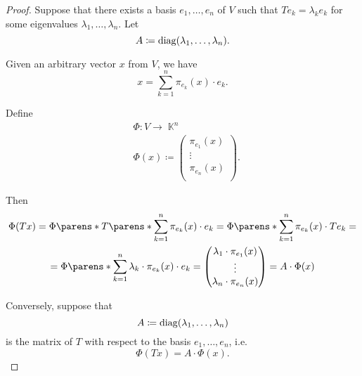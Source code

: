 \begin{proof}
   Suppose that there exists a basis \( e_1, \ldots, e_n \) of \( V \) such that \( T e_k = \lambda_k e_k \) for some eigenvalues \( \lambda_1, \ldots, \lambda_n \). Let
  \begin{equation*}
    A \coloneqq \op{diag}(\lambda_1, \ldots, \lambda_n).
  \end{equation*}

  Given an arbitrary vector \( x \) from \( V \), we have
  \begin{equation*}
    x = \sum_{k=1}^n \pi_{e_k}(x) \cdot e_k.
  \end{equation*}

  Define
  \begin{equation*}
    \begin{aligned}
      &\Phi: V \to \BbbK^n \\
      &\Phi(x) \coloneqq \begin{pmatrix}
        \pi_{e_1}(x) \\
        \vdots \\
        \pi_{e_n}(x) \\
      \end{pmatrix}.
    \end{aligned}
  \end{equation*}

  Then
  \begin{multline*}
    \Phi(T x)
    =
    \Phi\parens*{ T \parens*{ \sum_{k=1}^n \pi_{e_k}(x) \cdot e_k } }
    =
    \Phi\parens*{ \sum_{k=1}^n \pi_{e_k}(x) \cdot T e_k }
    = \\ =
    \Phi\parens*{ \sum_{k=1}^n \lambda_k \cdot \pi_{e_k}(x) \cdot e_k }
    =
    \begin{pmatrix}
      \lambda_1 \cdot \pi_{e_1}(x) \\
      \vdots \\
      \lambda_n \cdot \pi_{e_n}(x)
    \end{pmatrix}
    =
    A \cdot \Phi(x)
  \end{multline*}

   Conversely, suppose that
  \begin{equation*}
    A \coloneqq \op{diag}(\lambda_1, \ldots, \lambda_n)
  \end{equation*}
  is the matrix of \( T \) with respect to the basis \( e_1, \ldots, e_n \), i.e.
  \begin{equation*}
    \Phi(T x) = A \cdot \Phi(x).
  \end{equation*}


\end{proof}
